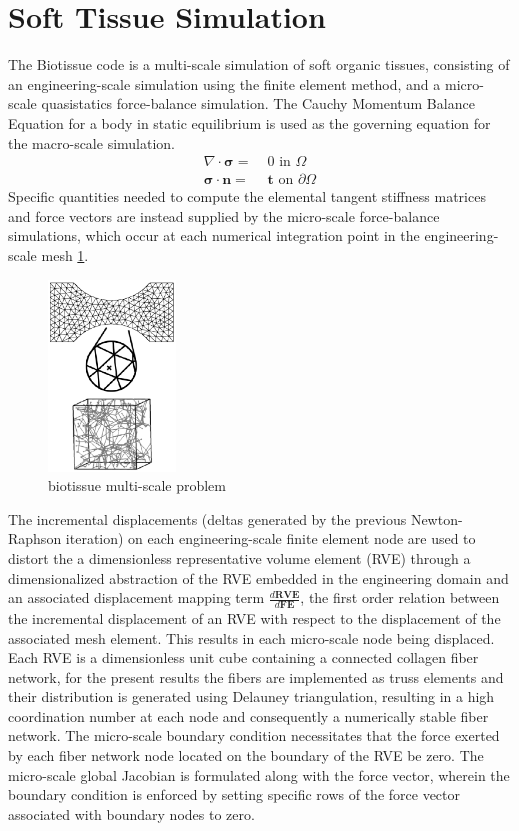 \documentclass[11pt]{article}
\begin{document}
\section{Soft Tissue Simulation}\label{biotissue}
The Biotissue code is a multi-scale simulation of soft organic tissues, consisting of an engineering-scale simulation using the finite element method, and a micro-scale quasistatics force-balance simulation. The Cauchy Momentum Balance Equation for a body in static equilibrium is used as the governing equation for the macro-scale simulation.
%
\begin{align}
\nabla \cdot \pmb{\sigma} =& \; 0 \text{ in } \Omega \label{momentum_balance} \nonumber \\
\pmb{\sigma} \cdot \pmb{n} =& \; \pmb{t} \text{ on } \partial \Omega \nonumber
\end{align}
%
Specific quantities needed to compute the elemental tangent stiffness matrices and force vectors are instead supplied by the micro-scale force-balance simulations, which occur at each numerical integration point in the engineering-scale mesh \ref{biotissue_hierarchy}.
%
\begin{figure}
  \begin{center}
    \includegraphics[height=2in]{biotissue_visual_hierarchy.eps}
  \end{center}
  \caption{\small biotissue multi-scale problem}
  \label{biotissue_hierarchy}
\end{figure}
%

The incremental displacements (deltas generated by the previous Newton-Raphson iteration) on each engineering-scale finite element node are used to distort the a dimensionless representative volume element (RVE) through a dimensionalized abstraction of the RVE embedded in the engineering domain and an associated displacement mapping term $\frac{d\mathbf{RVE}}{d\mathbf{FE}}$, the first order relation between the incremental displacement of an RVE with respect to the displacement of the associated mesh element. This results in each micro-scale node being displaced. Each RVE is a dimensionless unit cube containing a connected collagen fiber network, for the present results the fibers are implemented as truss elements and their distribution is generated using Delauney triangulation, resulting in a high coordination number at each node and consequently a numerically stable fiber network. The micro-scale boundary condition necessitates that the force exerted by each fiber network node located on the boundary of the RVE be zero. The micro-scale global Jacobian is formulated along with the force vector, wherein the boundary condition is enforced by setting specific rows of the force vector associated with boundary nodes to zero.
\end{document}

